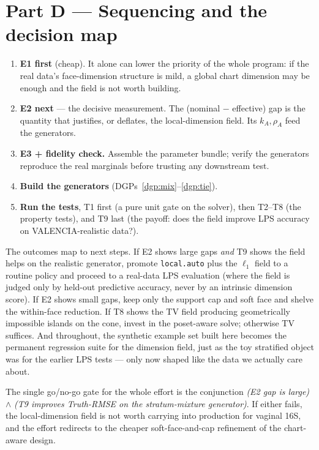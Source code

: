 \documentclass[11pt]{article}
\theoremstyle{definition}
\begin{document}
\section{Part D --- Sequencing and the decision map}\label{sec:sequencing}

\begin{enumerate}[leftmargin=1.6em]
\item \textbf{E1 first} (cheap). It alone can lower the priority of the whole
program: if the real data's face-dimension structure is mild, a global chart
dimension may be enough and the field is not worth building.
\item \textbf{E2 next} --- the decisive measurement. The (nominal $-$ effective)
gap is the quantity that justifies, or deflates, the local-dimension field. Its
$k_A,\rho_A$ feed the generators.
\item \textbf{E3 + fidelity check.} Assemble the parameter bundle; verify the
generators reproduce the real marginals before trusting any downstream test.
\item \textbf{Build the generators} (DGPs~\ref{dgp:mix}--\ref{dgp:tie}).
\item \textbf{Run the tests}, T1 first (a pure unit gate on the solver), then
T2--T8 (the property tests), and T9 last (the payoff: does the field improve LPS
accuracy on VALENCIA-realistic data?).
\end{enumerate}

The outcomes map to next steps. If E2 shows large gaps \emph{and} T9 shows the
field helps on the realistic generator, promote \texttt{local.auto} plus the
$\ell_1$ field to a routine policy and proceed to a real-data LPS evaluation
(where the field is judged only by held-out predictive accuracy, never by an
intrinsic dimension score). If E2 shows small gaps, keep only the support cap and
soft face and shelve the within-face reduction. If T8 shows the TV field
producing geometrically impossible islands on the cone, invest in the
poset-aware solve; otherwise TV suffices. And throughout, the synthetic example
set built here becomes the permanent regression suite for the dimension field,
just as the toy stratified object was for the earlier LPS tests --- only now
shaped like the data we actually care about.

\begin{decision}
The single go/no-go gate for the whole effort is the conjunction
\emph{(E2 gap is large)} $\wedge$ \emph{(T9 improves Truth-RMSE on the
stratum-mixture generator)}. If either fails, the local-dimension field is not
worth carrying into production for vaginal 16S, and the effort redirects to the
cheaper soft-face-and-cap refinement of the chart-aware design.
\end{decision}
\end{document}
